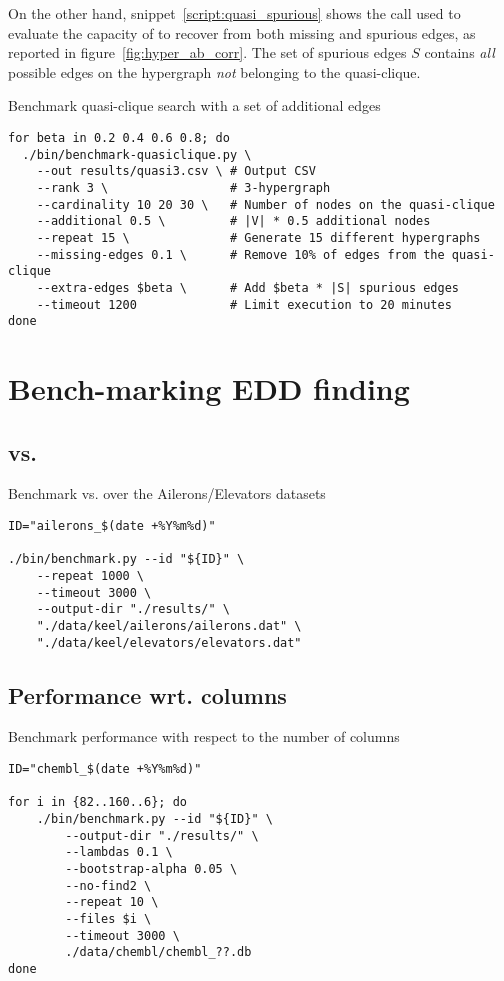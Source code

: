 On the other hand, snippet~\ref{script:quasi_spurious} shows the call used to evaluate
the capacity of \PresQ to recover from both missing and spurious edges, as reported in
figure~\ref{fig:hyper_ab_corr}. The set of spurious edges $S$ contains \emph{all} possible edges
on the hypergraph \emph{not} belonging to the quasi-clique.

\begin{code}
\caption{Benchmark quasi-clique search with a set of additional edges}\label{script:quasi_spurious}
\begin{verbatim}
for beta in 0.2 0.4 0.6 0.8; do
  ./bin/benchmark-quasiclique.py \
    --out results/quasi3.csv \ # Output CSV
    --rank 3 \                 # 3-hypergraph
    --cardinality 10 20 30 \   # Number of nodes on the quasi-clique
    --additional 0.5 \         # |V| * 0.5 additional nodes
    --repeat 15 \              # Generate 15 different hypergraphs
    --missing-edges 0.1 \      # Remove 10% of edges from the quasi-clique
    --extra-edges $beta \      # Add $beta * |S| spurious edges
    --timeout 1200             # Limit execution to 20 minutes
done
\end{verbatim}
\end{code}

\section{Bench-marking EDD finding}

\subsection{\Find vs. \PresQ}

\begin{code}
\label{script:edd_finding}
\caption{Benchmark \Find vs. \PresQ over the Ailerons/Elevators datasets}
\begin{verbatim}
ID="ailerons_$(date +%Y%m%d)"

./bin/benchmark.py --id "${ID}" \
    --repeat 1000 \
    --timeout 3000 \
    --output-dir "./results/" \
    "./data/keel/ailerons/ailerons.dat" \
    "./data/keel/elevators/elevators.dat"
\end{verbatim}
\end{code}

\subsection{Performance wrt. columns}

\begin{code}
\label{script:perf_columns}
\caption{Benchmark performance with respect to the number of columns}
\begin{verbatim}
ID="chembl_$(date +%Y%m%d)"

for i in {82..160..6}; do
    ./bin/benchmark.py --id "${ID}" \
        --output-dir "./results/" \
        --lambdas 0.1 \
        --bootstrap-alpha 0.05 \
        --no-find2 \
        --repeat 10 \
        --files $i \
        --timeout 3000 \
        ./data/chembl/chembl_??.db
done
\end{verbatim}
\end{code}
